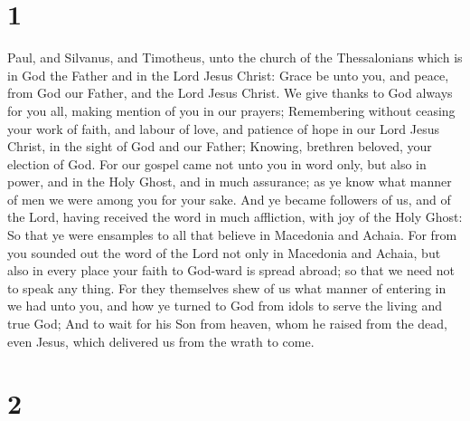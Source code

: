 \hypertarget{section}{%
\section{1}\label{section}}

 Paul, and Silvanus, and Timotheus, unto the church of the
Thessalonians which is in God the Father and in the Lord Jesus Christ:
Grace be unto you, and peace, from God our Father, and the Lord Jesus
Christ.  We give thanks to God always for you all, making
mention of you in our prayers;  Remembering without ceasing
your work of faith, and labour of love, and patience of hope in our Lord
Jesus Christ, in the sight of God and our Father;  Knowing,
brethren beloved, your election of God.  For our gospel came
not unto you in word only, but also in power, and in the Holy Ghost, and
in much assurance; as ye know what manner of men we were among you for
your sake.  And ye became followers of us, and of the Lord,
having received the word in much affliction, with joy of the Holy Ghost:
 So that ye were ensamples to all that believe in Macedonia
and Achaia.  For from you sounded out the word of the Lord
not only in Macedonia and Achaia, but also in every place your faith to
God-ward is spread abroad; so that we need not to speak any thing.
 For they themselves shew of us what manner of entering in
we had unto you, and how ye turned to God from idols to serve the living
and true God;  And to wait for his Son from heaven, whom he
raised from the dead, even Jesus, which delivered us from the wrath to
come.

\hypertarget{section-1}{%
\section{2}\label{section-1}}

